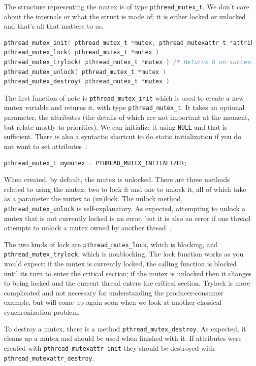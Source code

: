 \documentclass[a4paper]{report}
\begin{document}
The structure representing the mutex is of type \texttt{pthread\_mutex\_t}. We don't care about the internals or what the struct is made of; it is either locked or unlocked and that's all that matters to us.

\begin{lstlisting}[language=C]
pthread_mutex_init( pthread_mutex_t *mutex, pthread_mutexattr_t *attributes )
pthread_mutex_lock( pthread_mutex_t *mutex )
pthread_mutex_trylock( pthread_mutex_t *mutex ) /* Returns 0 on success */
pthread_mutex_unlock( pthread_mutex_t *mutex )
pthread_mutex_destroy( pthread_mutex_t *mutex )
\end{lstlisting}

The first function of note is \texttt{pthread\_mutex\_init} which is used to create a new mutex variable and returns it, with type \texttt{pthread\_mutex\_t}. It takes an optional parameter, the attributes (the details of which are not important at the moment, but relate mostly to priorities). We can initialize it using \texttt{NULL} and that is sufficient. There is also a syntactic shortcut to do static initialization if you do not want to set attributes~\cite{pthreads}:

\begin{lstlisting}[language=C]
pthread_mutex_t mymutex = PTHREAD_MUTEX_INITIALIZER;
\end{lstlisting}

When created, by default, the mutex is unlocked. There are three methods related to using the mutex; two to lock it and one to unlock it, all of which take as a parameter the mutex to (un)lock. The unlock method, \texttt{pthread\_mutex\_unlock} is self-explanatory. As expected, attempting to unlock a mutex that is not currently locked is an error, but it is also an error if one thread attempts to unlock a mutex owned by another thread~\cite{pthreads}.

The two kinds of lock are \texttt{pthread\_mutex\_lock}, which is blocking, and \texttt{pthread\_mutex\_trylock}, which is nonblocking. The lock function works as you would expect: if the mutex is currently locked, the calling function is blocked until its turn to enter the critical section; if the mutex is unlocked then it changes to being locked and the current thread enters the critical section. Trylock is more complicated and not necessary for understanding the producer-consumer example, but will come up again soon when we look at another classical synchronization problem.

To destroy a mutex, there is a method \texttt{pthread\_mutex\_destroy}. As expected, it cleans up a mutex and should be used when finished with it. If attributes were created with \texttt{pthread\_mutexattr\_init} they should be destroyed with \texttt{pthread\_mutexattr\_destroy}.
\end{document}
